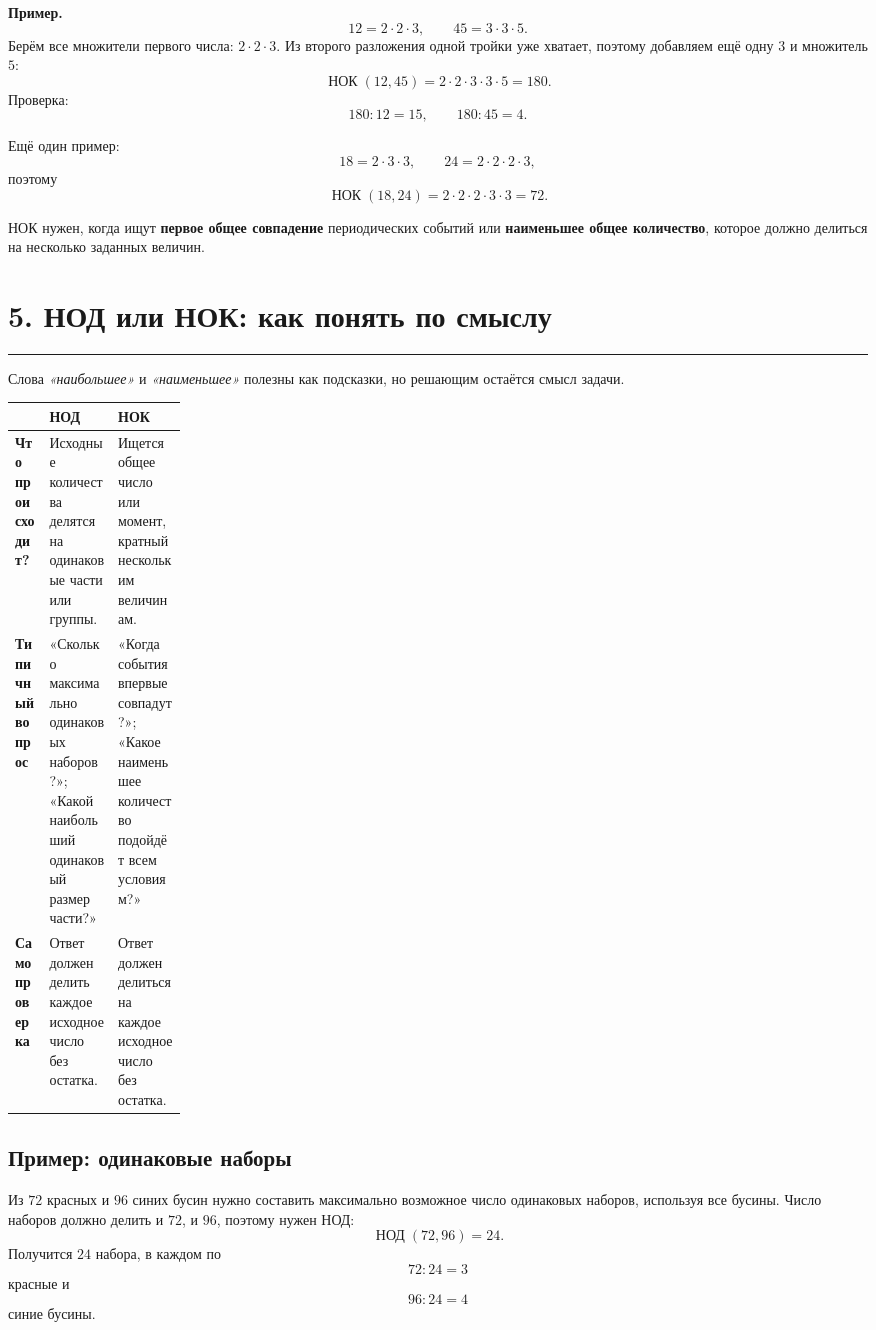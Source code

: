 \documentclass[a4paper,12pt]{article}
\newcommand{\nodru}{\mathop{\text{НОД}}\nolimits}
\newcommand{\nokru}{\mathop{\text{НОК}}\nolimits}
\newcommand{\sectionline}{%
  \vspace{-0.2em}\par\noindent
  {\color{accent}\rule{\linewidth}{0.55pt}}%
  \vspace{0.35em}
}
\newcommand{\keyidea}[1]{%
  \par\noindent{\color{darkaccent}\bfseries #1}\par
}
\begin{document}
\textbf{Пример.}
\[
12=2\cdot2\cdot3,
\qquad
45=3\cdot3\cdot5.
\]
Берём все множители первого числа: \(2\cdot2\cdot3\).
Из второго разложения одной тройки уже хватает, поэтому добавляем ещё одну \(3\) и множитель \(5\):
\[
\nokru(12,45)
=2\cdot2\cdot3\cdot3\cdot5
=180.
\]
Проверка:
\[
180:12=15,
\qquad
180:45=4.
\]

Ещё один пример:
\[
18=2\cdot3\cdot3,
\qquad
24=2\cdot2\cdot2\cdot3,
\]
поэтому
\[
\nokru(18,24)=2\cdot2\cdot2\cdot3\cdot3=72.
\]

\keyidea{Смысл НОК в задачах}

НОК нужен, когда ищут \textbf{первое общее совпадение} периодических событий или \textbf{наименьшее общее количество}, которое должно делиться на несколько заданных величин.

\clearpage
\section*{5. НОД или НОК: как понять по смыслу}
\sectionline

Слова \textit{«наибольшее»} и \textit{«наименьшее»} полезны как подсказки, но решающим остаётся смысл задачи.

\renewcommand{\arraystretch}{1.35}
\begin{tabularx}{\linewidth}{@{}>{\bfseries}p{0.20\linewidth}YY@{}}
\toprule
 & НОД & НОК \\
\midrule
Что происходит?
& Исходные количества делятся на одинаковые части или группы.
& Ищется общее число или момент, кратный нескольким величинам. \\
Типичный вопрос
& «Сколько максимально одинаковых наборов?»; «Какой наибольший одинаковый размер части?»
& «Когда события впервые совпадут?»; «Какое наименьшее количество подойдёт всем условиям?» \\
Самопроверка
& Ответ должен делить каждое исходное число без остатка.
& Ответ должен делиться на каждое исходное число без остатка. \\
\bottomrule
\end{tabularx}

\subsection*{Пример: одинаковые наборы}

Из \(72\) красных и \(96\) синих бусин нужно составить максимально возможное число одинаковых наборов, используя все бусины.
Число наборов должно делить и \(72\), и \(96\), поэтому нужен НОД:
\[
\nodru(72,96)=24.
\]
Получится \(24\) набора, в каждом по
\[
72:24=3
\]
красные и
\[
96:24=4
\]
синие бусины.
\end{document}
